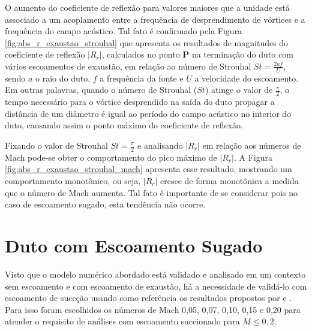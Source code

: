 O aumento do coeficiente de reflexão para valores maiores que a unidade está associado a um acoplamento entre a frequência de desprendimento de vórtices e a frequência do campo acústico. Tal fato é confirmado pela Figura \ref{fig:abs_r_exaustao_strouhal} que apresenta os resultados de magnitudes do coeficiente de reflexão $|R_{r}|$, calculados no ponto $\textbf{P}$ na terminação do duto com vários escoamentos de exaustão, em relação ao número de Strouhal $St = \frac{2af}{U}$, sendo $a$ o raio do duto, $f$ a frequência da fonte e $U$ a velocidade do escoamento. Em outras palavras, quando o número de Strouhal ($St$) atinge o valor de $\frac{\pi}{2}$, o tempo necessário para o vórtice desprendido na saída do duto propagar a distância de um diâmetro é igual ao período do campo acústico no interior do duto, causando assim o ponto máximo do coeficiente de reflexão.

\begin{figure}[ht!]
\centering
  
\end{figure}

Fixando o valor de Strouhal $St = \frac{\pi}{2}$ e analisando $|R_{r}|$ em relação aos números de Mach pode-se obter o comportamento do pico máximo de $|R_{r}|$. A Figura \ref{fig:abs_r_exaustao_strouhal_mach} apresenta esse resultado, mostrando um comportamento monotônico, ou seja, $|R_{r}|$ cresce de forma monotônica a medida que o número de Mach aumenta. Tal fato é importante de se considerar pois no caso de escoamento sugado, esta tendência não ocorre.  

\begin{figure}[ht!]
\centering
  
\end{figure}

\newpage
\section{Duto com Escoamento Sugado}

Visto que o modelo numérico abordado está validado e analisado em um contexto sem escoamento e com escoamento de exaustão, há a necessidade de validá-lo com escoamento de succção usando como referência os resultados propostos por  e . Para isso foram escolhidos os números de Mach 0,05, 0,07, 0,10, 0,15 e 0,20 para atender o requisito de  análises com escoamento succionado para $M \leq 0,2$.

